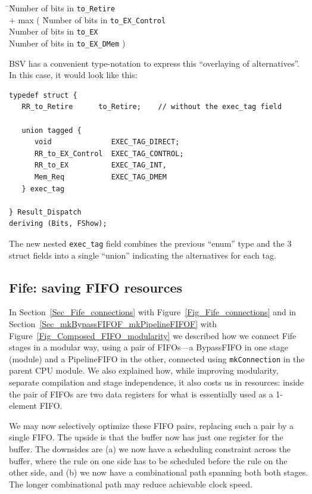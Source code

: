 \begin{tabbing}
\hmm \= \hmm \= Number of bits in {\tt to\_Retire} \\
     \> $+$  \> max ( \= Number of bits in {\tt to\_EX\_Control} \\
     \>      \>       \> Number of bits in {\tt to\_EX} \\
     \>      \>       \> Number of bits in {\tt to\_EX\_DMem} )
\end{tabbing}

BSV has a convenient type-notation to express this ``overlaying of
alternatives''.  In this case, it would look like this:

{\small
\begin{Verbatim}[frame=single]
typedef struct {
   RR_to_Retire      to_Retire;    // without the exec_tag field

   union tagged {
      void              EXEC_TAG_DIRECT;
      RR_to_EX_Control  EXEC_TAG_CONTROL;
      RR_to_EX          EXEC_TAG_INT,
      Mem_Req           EXEC_TAG_DMEM
   } exec_tag

} Result_Dispatch
deriving (Bits, FShow);
\end{Verbatim}
}

The new nested \verb|exec_tag| field combines the previous ``enum''
type and the 3 struct fields into a single ``union'' indicating the
alternatives for each tag.


\subsection{Fife: saving FIFO resources}

In Section~\ref{Sec_Fife_connections} with
Figure~\ref{Fig_Fife_connections} and in
Section~\ref{Sec_mkBypassFIFOF_mkPipelineFIFOF} with
Figure~\ref{Fig_Composed_FIFO_modularity} we described how we connect
Fife stages in a modular way, using a pair of FIFOs---a BypassFIFO in
one stage (module) and a PipelineFIFO in the other, connected using
\verb|mkConnection| in the parent CPU module.  We also explained how,
while improving modularity, separate compilation and stage
independence, it also costs us in resources: inside the pair of FIFOs
are two data registers for what is essentially used as a 1-element
FIFO.

We may now selectively optimize these FIFO pairs, replacing such a
pair by a single FIFO. The upside is that the buffer now has just one
register for the buffer.  The downsides are (a) we now have a
scheduling constraint across the buffer, where the rule on one side
has to be scheduled before the rule on the other side, and (b) we now
have a combinational path spanning both both stages.  The longer
combinational path may reduce achievable clock speed.

